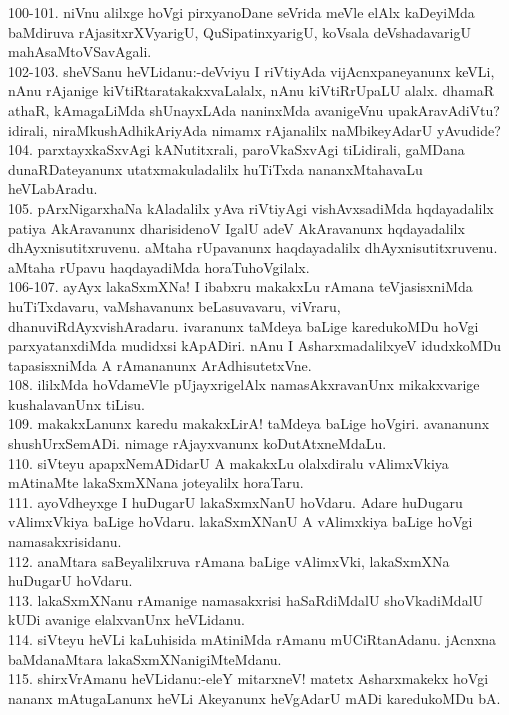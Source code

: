 \documentclass{article}
\begin{document}
100-101. niVnu alilxge hoVgi pirxyanoDane seVrida meVle elAlx kaDeyiMda baMdiruva rAjasitxrXVyarigU, QuSipatinxyarigU, koVsala deVshadavarigU mahAsaMtoVSavAgali.\\
102-103. sheVSanu heVLidanu:-deVviyu I riVtiyAda vijAcnxpaneyanunx keVLi, nAnu rAjanige kiVtiRtaratakakxvaLalalx, nAnu kiVtiRrUpaLU alalx. dhamaR athaR, kAmagaLiMda shUnayxLAda naninxMda avanigeVnu upakAravAdiVtu? idirali, niraMkushAdhikAriyAda nimamx rAjanalilx naMbikeyAdarU yAvudide?\\
104. parxtayxkaSxvAgi kANutitxrali, paroVkaSxvAgi tiLidirali, gaMDana dunaRDateyanunx utatxmakuladalilx huTiTxda nananxMtahavaLu heVLabAradu.\\
105. pArxNigarxhaNa kAladalilx yAva riVtiyAgi vishAvxsadiMda hqdayadalilx patiya AkAravanunx dharisidenoV IgalU adeV AkAravanunx hqdayadalilx dhAyxnisutitxruvenu. aMtaha rUpavanunx haqdayadalilx dhAyxnisutitxruvenu. aMtaha rUpavu haqdayadiMda horaTuhoVgilalx.\\
106-107. ayAyx lakaSxmXNa! I ibabxru makakxLu rAmana teVjasisxniMda huTiTxdavaru, vaMshavanunx beLasuvavaru, viVraru, dhanuviRdAyxvishAradaru. ivaranunx taMdeya baLige karedukoMDu hoVgi parxyatanxdiMda mudidxsi kApADiri. nAnu I AsharxmadalilxyeV idudxkoMDu tapasisxniMda A rAmananunx ArAdhisutetxVne.\\
108. ililxMda hoVdameVle pUjayxrigelAlx namasAkxravanUnx mikakxvarige kushalavanUnx tiLisu.\\
109. makakxLanunx karedu makakxLirA! taMdeya baLige hoVgiri. avananunx shushUrxSemADi. nimage rAjayxvanunx koDutAtxneMdaLu.\\
110. siVteyu apapxNemADidarU A makakxLu olalxdiralu vAlimxVkiya mAtinaMte lakaSxmXNana joteyalilx horaTaru.\\
111. ayoVdheyxge I huDugarU lakaSxmxNanU hoVdaru. Adare huDugaru vAlimxVkiya baLige hoVdaru. lakaSxmXNanU A vAlimxkiya baLige hoVgi namasakxrisidanu.\\
112. anaMtara saBeyalilxruva rAmana baLige vAlimxVki, lakaSxmXNa huDugarU hoVdaru.\\
113. lakaSxmXNanu rAmanige namasakxrisi haSaRdiMdalU shoVkadiMdalU kUDi avanige elalxvanUnx heVLidanu.\\
114. siVteyu heVLi kaLuhisida mAtiniMda rAmanu mUCiRtanAdanu. jAcnxna baMdanaMtara lakaSxmXNanigiMteMdanu.\\
115. shirxVrAmanu heVLidanu:-eleY mitarxneV! matetx Asharxmakekx hoVgi nananx mAtugaLanunx heVLi Akeyanunx heVgAdarU mADi karedukoMDu bA.\\
\end{document}
